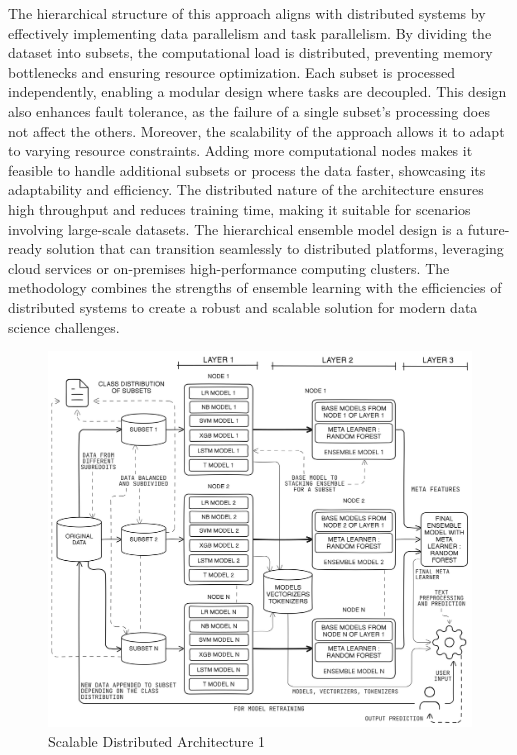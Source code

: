 \vspace{1em}

\noindent
The hierarchical structure of this approach aligns with distributed systems by effectively implementing data parallelism and task parallelism. By dividing the dataset into subsets, the computational load is distributed, preventing memory bottlenecks and ensuring resource optimization. Each subset is processed independently, enabling a modular design where tasks are decoupled. This design also enhances fault tolerance, as the failure of a single subset’s processing does not affect the others. Moreover, the scalability of the approach allows it to adapt to varying resource constraints. Adding more computational nodes makes it feasible to handle additional subsets or process the data faster, showcasing its adaptability and efficiency. The distributed nature of the architecture ensures high throughput and reduces training time, making it suitable for scenarios involving large-scale datasets. The hierarchical ensemble model design is a future-ready solution that can transition seamlessly to distributed platforms, leveraging cloud services or on-premises high-performance computing clusters. The methodology combines the strengths of ensemble learning with the efficiencies of distributed systems to create a robust and scalable solution for modern data science challenges.

\vspace{1em}

\begin{figure}[h!]  
    \centering
    \includegraphics[width=1.0\textwidth]{Images/Distributed.png}  
    \caption{Scalable Distributed Architecture 1}
    \label{lstm archi}  %
\end{figure}


